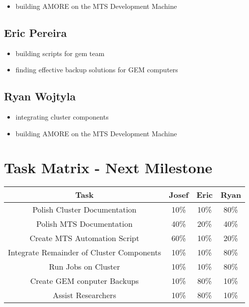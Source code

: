 \documentclass[12pt]{article}
\begin{document}
\begin{itemize}
\item building AMORE on the MTS Development Machine
\end{itemize}

\subsection{Eric Pereira}

\begin{itemize}
\item building scripts for gem team
\item finding effective backup solutions for GEM computers
\end{itemize}

\subsection{Ryan Wojtyla}

\begin{itemize}
\item integrating cluster components
\item building AMORE on the MTS Development Machine
\end{itemize}

\section{Task Matrix - Next Milestone}

\begin{center}
  \begin{tabular}{|c|c|c|c|}
    \hline
    Task & Josef & Eric & Ryan \\
    \hline
    Polish Cluster Documentation & 10\% & 10\% & 80\% \\
    Polish MTS Documentation & 40\% & 20\% & 40\% \\
    Create MTS Automation Script & 60\% & 10\% & 20\% \\
    Integrate Remainder of Cluster Components & 10\% & 10\% & 80\% \\
    Run Jobs on Cluster & 10\% & 10\% & 80\% \\
    Create GEM conputer Backups & 10\% & 80\% & 10\% \\
    Assist Researchers & 10\% & 80\% & 10\% \\
    \hline
  \end{tabular}
\end{center}
\end{document}
